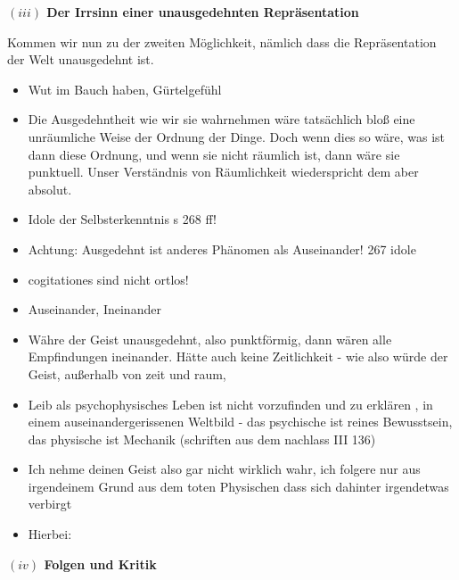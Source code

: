 \documentclass[a4paper, 12pt]{article}
\begin{document}
\begin{onehalfspace}
\vspace{5mm}
\noindent\textbf{$(iii)$ Der Irrsinn einer unausgedehnten Repräsentation}


Kommen wir nun zu der zweiten Möglichkeit, nämlich dass die Repräsentation der Welt unausgedehnt ist. 


\begin{itemize}
  \item Wut im Bauch haben, Gürtelgefühl
  \item Die Ausgedehntheit wie wir sie wahrnehmen wäre tatsächlich bloß eine unräumliche Weise der Ordnung der Dinge. Doch wenn dies so wäre, was ist dann diese Ordnung, und wenn sie nicht räumlich ist, dann wäre sie punktuell. Unser Verständnis von Räumlichkeit wiederspricht dem aber absolut.
  \item Idole der Selbsterkenntnis s 268 ff!
  \item Achtung: Ausgedehnt ist anderes Phänomen als Auseinander! 267 idole
  \item cogitationes sind nicht ortlos!
  \item Auseinander, Ineinander
  \item Währe der Geist unausgedehnt, also punktförmig, dann wären alle Empfindungen ineinander. Hätte auch keine Zeitlichkeit - wie also würde der Geist, außerhalb von zeit und raum, 
  \item Leib als psychophysisches Leben ist nicht vorzufinden und zu erklären , in einem auseinandergerissenen Weltbild - das psychische ist reines Bewusstsein, das physische ist Mechanik (schriften aus dem nachlass III 136)
  \item Ich nehme deinen Geist also gar nicht wirklich wahr, ich folgere nur aus irgendeinem Grund aus dem toten Physischen dass sich dahinter irgendetwas verbirgt
  \item Hierbei: 
\end{itemize}






\vspace{5mm}
\noindent\textbf{$(iv)$ Folgen und Kritik}




\end{onehalfspace}
\end{document}
